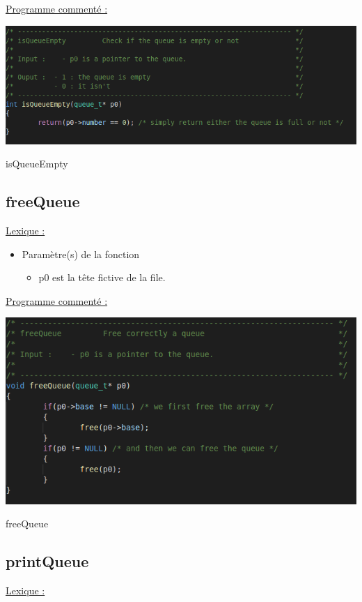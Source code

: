 \documentclass[a4paper]{article}
\begin{document}
\underline{Programme commenté :}
\begin{center}
\includegraphics[scale=0.4]{isQueueEmpty.png}

isQueueEmpty
\end{center}
\subsection{freeQueue}
\underline{Lexique :}

\begin{itemize}

\item Paramètre(s) de la fonction  

\begin{itemize}

\item p0 est la tête fictive de la file.

\end{itemize}

\end{itemize}

\underline{Programme commenté :}
\begin{center}
\includegraphics[scale=0.4]{freeQueue.png}

freeQueue
\end{center}
\subsection{printQueue}
\underline{Lexique :}
\end{document}
